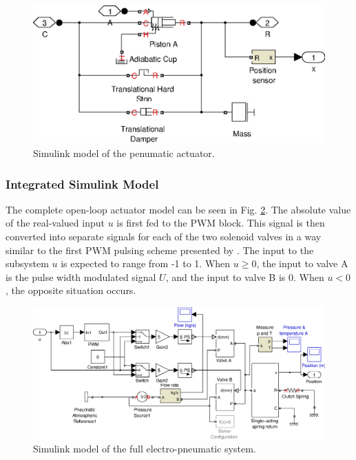 \begin{figure}[H]
\centering
\includegraphics[scale=0.65]{implementation/figures/pneumatic_modelling3}
\caption{Simulink model of the penumatic actuator.}
\label{fig:pneumatics_actuator}
\end{figure}

\subsubsection{Integrated Simulink Model}

The complete open-loop actuator model can be seen in Fig. \ref{fig:pneumatics_model_full}. The absolute value of the real-valued input $u$ is first fed to the PWM block. This signal is then converted into separate signals for each of the two solenoid valves in a way similar to the first PWM pulsing scheme presented by \citet{accurate_position}. The input to the subsystem $u$ is expected to range from -1 to 1. When $u\geq0$, the input to valve A is the pulse width modulated signal $U$, and the input to valve B is 0. When $u<0$, the opposite situation occurs.

\begin{figure}[H]
\centering
\includegraphics[scale=0.65]{implementation/figures/pneumatic_modelling4}
\caption{Simulink model of the full electro-pneumatic system.}
\label{fig:pneumatics_model_full}
\end{figure}

